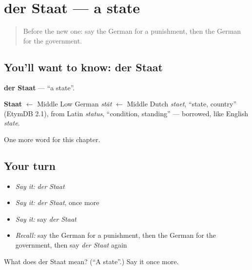 \section[der Staat]{der Staat — a state}

\label{lesson:GE-C208-staat}



\begin{quote}
Before the new one: say the German for a punishment, then the German for the government.
\end{quote}

\subsection*{You'll want to know: der Staat}
\textbf{der Staat} — \textquotedblleft{}a state\textquotedblright{}.

\begin{cousinweb}
\textbf{Staat} $\leftarrow$ Middle Low German \emph{stāt} $\leftarrow$ Middle Dutch \emph{staet}, \textquotedblleft{}state, country\textquotedblright{} (EtymDB 2.1), from Latin \emph{status}, \textquotedblleft{}condition, standing\textquotedblright{} — borrowed, like English \emph{state}.
\end{cousinweb}

\begin{grammarlens}[title={What you've built}]
One more word for this chapter.
\end{grammarlens}

\subsection*{Your turn}
\begin{itemize}
\raggedright
  \item \emph{Say it:} \emph{der Staat}
  \item \emph{Say it:} \emph{der Staat}, once more
  \item \emph{Say it:} say \emph{der Staat}
  \item \emph{Recall:} say the German for a punishment, then the German for the government, then say \emph{der Staat} again
\end{itemize}

\begin{tcolorbox}[breakable,colback=teal!4,colframe=teal!35!black,title={Before you move on}]
What does der Staat mean? (\textquotedblleft{}A state\textquotedblright{}.) Say it once more.
\end{tcolorbox}
